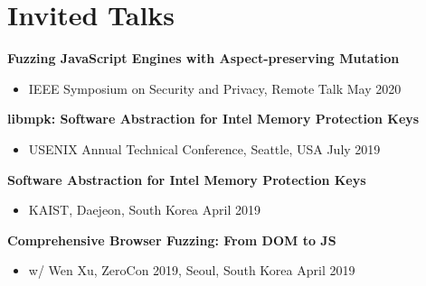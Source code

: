 \section*{Invited Talks}
\begin{description}

    \item \textbf{Fuzzing JavaScript Engines with Aspect-preserving Mutation}
      \begin{itemize}
          \item IEEE Symposium on Security and Privacy, Remote Talk \dotfill May 2020
      \end{itemize}

    \item \textbf{libmpk: Software Abstraction for Intel Memory Protection Keys}
      \begin{itemize}
          \item USENIX Annual Technical Conference, Seattle, USA \dotfill July 2019
      \end{itemize}

    \item \textbf{Software Abstraction for Intel Memory Protection Keys}
      \begin{itemize}
         \item KAIST, Daejeon, South Korea \dotfill April 2019
      \end{itemize}

    \item \textbf{Comprehensive Browser Fuzzing: From DOM to JS}
      \begin{itemize}
          \item w/ Wen Xu, ZeroCon 2019, Seoul, South Korea \dotfill April 2019
      \end{itemize}
      
\end{description}
